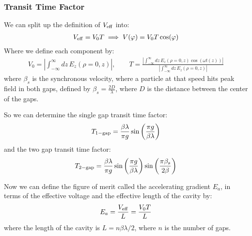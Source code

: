 \documentclass{article}
\numberwithin{equation}{section}
\begin{document}
\subsubsection{Transit Time Factor}
We can split up the definition of $V_{\rm eff}$ into:
\begin{align}
 V_{\rm eff} = V_0 T \implies V(\varphi) = V_0 T \cos(\varphi)
\end{align}
Where we define each component by:
\begin{align}
V_0 = \left|\int_{-\infty}^{\infty} dz \, E_z(\rho=0,z) \right| ,\qquad
T = \frac{\left| \int_{-\infty}^{\infty} dz \, E_z(\rho=0,z) \cos(\omega t(z)) \right| }{\left|\int_{-\infty}^{\infty} dz \, E_z(\rho=0,z) \right|}
\end{align}
where $\beta_s$ is the synchronous velocity, where a particle at that speed hits peak field in both gaps, defined by $\beta_s = \frac{2D}{\lambda}$, where $D$ is the distance between the center of the gaps.

So we can determine the single gap transit time factor:
\begin{align}
T_{\rm 1-gap} = \frac{\beta \lambda}{\pi g} \sin \left( \frac{\pi g}{\beta \lambda} \right)
\end{align}
and the two gap transit time factor:
\begin{align}
T_{\rm 2-gap} = \frac{\beta \lambda}{\pi g} \sin \left( \frac{\pi g}{\beta \lambda} \right) \sin \left( \frac{\pi \beta_s}{2 \beta } \right)
\end{align}

Now we can define the figure of merit called the accelerating gradient $E_a$, in terms of the effective voltage and the effective length of the cavity by:
\begin{align}
E_a = \frac{V_{\rm eff}}{L} = \frac{V_0 T}{L}
\end{align}
where the length of the cavity is $L = n \beta \lambda /2$, where $n$ is the number of gaps.
\end{document}
